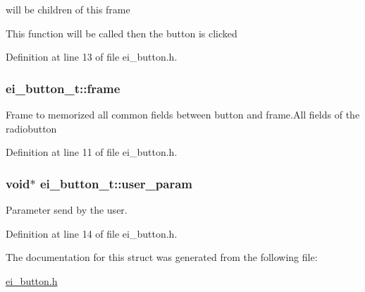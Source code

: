 will be children of this frame 

This function will be called then the button is clicked 

Definition at line 13 of file ei\+\_\+button.\+h.

\hypertarget{structei__button__t_ae72bf3615425f3565c74f0883646d8b9}{
\subsubsection[{frame}]{ ei\+\_\+button\+\_\+t\+::frame}}\label{structei__button__t_ae72bf3615425f3565c74f0883646d8b9}
Frame to memorized all common fields between button and frame.\+All fields of the radiobutton 

Definition at line 11 of file ei\+\_\+button.\+h.

\hypertarget{structei__button__t_a56591ce45c0b47abf6ce150d5beef366}{
\subsubsection[{user\+\_\+param}]{\setlength{\rightskip}{0pt plus 5cm}void$\ast$ ei\+\_\+button\+\_\+t\+::user\+\_\+param}}\label{structei__button__t_a56591ce45c0b47abf6ce150d5beef366}


Parameter send by the user. 



Definition at line 14 of file ei\+\_\+button.\+h.



The documentation for this struct was generated from the following file\+:\begin{DoxyCompactItemize}
\item 
\hyperlink{ei__button_8h}{ei\+\_\+button.\+h}\end{DoxyCompactItemize}
